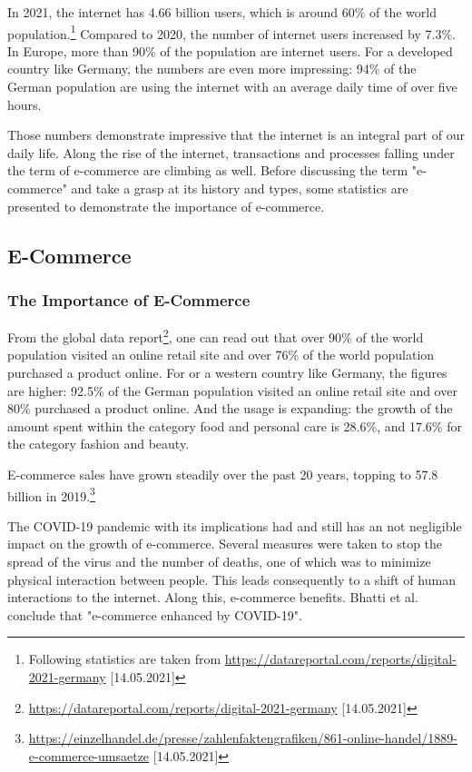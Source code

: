 
In 2021, the internet has 4.66 billion users, which is around 60\% of the world population.\footnote{Following statistics are taken from \url{https://datareportal.com/reports/digital-2021-germany} [14.05.2021]}
Compared to 2020, the number of internet users increased by 7.3\%.
In Europe, more than 90\% of the population are internet users.
For a developed country like Germany, the numbers are even more impressing:
94\% of the German population are using the internet with an average daily time of over five hours.

Those numbers demonstrate impressive that the internet is an integral part of our daily life.
Along the rise of the internet, transactions and processes falling under the term of e-commerce are climbing as well.
Before discussing the term "e-commerce" and take a grasp at its history and types, some statistics are presented to demonstrate the importance of e-commerce.


\subsection{E-Commerce}
\label{chapter:ecommerce_subchapter}

\subsubsection{The Importance of E-Commerce} %

From the global data report\footnote{\url{https://datareportal.com/reports/digital-2021-germany} [14.05.2021]}, one can read out that over 90\% of the world population visited an online retail site and over 76\% of the world population purchased a product online.
For or a western country like Germany, the figures are higher:
92.5\% of the German population visited an online retail site and over 80\% purchased a product online.
And the usage is expanding: the growth of the amount spent within the category food and personal care is 28.6\%, and 17.6\% for the category fashion and beauty.

E-commerce sales have grown steadily over the past 20 years, topping to 57.8 billion in 2019.\footnote{\url{https://einzelhandel.de/presse/zahlenfaktengrafiken/861-online-handel/1889-e-commerce-umsaetze} [14.05.2021]}


The COVID-19 pandemic with its implications had and still has an not negligible impact on the growth of e-commerce.
Several measures were taken to stop the spread of the virus and the number of deaths, one of which was to minimize physical interaction between people.
This leads consequently to a shift of human interactions to the internet.
Along this, e-commerce benefits.
Bhatti et al. \cite{2020Bhatti} conclude that "e-commerce enhanced by COVID-19".



